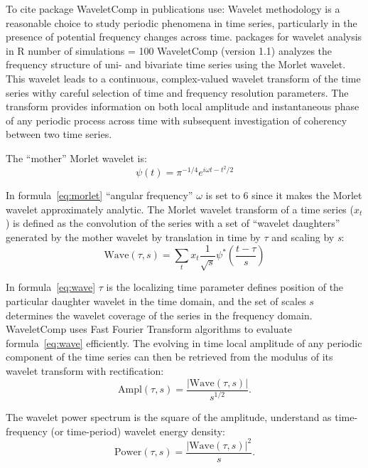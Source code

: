 \documentclass{biophys-new}
\begin{document}
To cite package WaveletComp in publications use: \cite{rosch2016waveletcomp}
Wavelet methodology is a reasonable choice to study periodic phenomena in time series, particularly in
the presence of potential frequency changes across time.
packages for wavelet analysis in R
number of simulations = 100
WaveletComp (version 1.1) analyzes the frequency structure of uni- and bivariate time series using the Morlet wavelet.
This wavelet leads to a continuous, complex-valued wavelet transform of the time series withy careful selection of time and frequency resolution parameters. The transform provides information on both local amplitude and instantaneous phase of any periodic process across time with subsequent investigation of coherency between two time series.


The “mother” Morlet wavelet is:
\begin{equation}\label{eq:morlet}
\psi(t)=\pi^{-1/4}e^{i\omega t-{t^2}/2}
\end{equation}


In formula~\ref{eq:morlet} “angular frequency” $\omega$ is set to 6 since it makes the Morlet wavelet approximately analytic.
The Morlet wavelet transform of a time series (${x}_{t}$) is defined as the convolution of the series with a set of “wavelet daughters” generated by the mother wavelet by translation in time by $\tau$ and scaling by \textit{s}:
\begin{equation}\label{eq:wave}
\text{Wave}(\tau, s)=\sum_{t}x_{t}\frac{1}{\sqrt{s}}\psi^{\ast}\left(\frac{t-\tau}{s}\right)
\end{equation}

In formula~\ref{eq:wave} $\tau$ is the localizing time parameter defines position of the particular daughter wavelet in the time domain, and the set of scales $s$ determines the wavelet coverage of the series in the frequency domain.
WaveletComp uses Fast Fourier Transform algorithms to evaluate formula~\ref{eq:wave} efficiently.
The evolving in time local amplitude of any periodic component of the time series can then be retrieved from the modulus of its wavelet transform with rectification:
\begin{equation}\label{eq:amplitude}
\text{Ampl}(\tau, s)=\frac{|\text{Wave}(\tau, s)|}{s^{1/2}}.
\end{equation}

The wavelet power spectrum is the square of the amplitude, understand as time-frequency (or time-period) wavelet energy density:
\begin{equation}\label{eq:power}
\text{Power}(\tau, s)=\frac{|\text{Wave}(\tau, s)|^2}{s}.
\end{equation}
\end{document}
